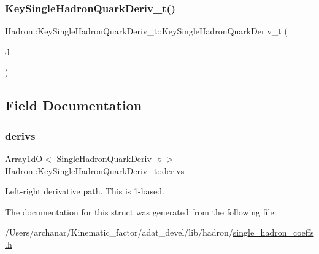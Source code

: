 \mbox{\label{structHadron_1_1KeySingleHadronQuarkDeriv__t_a35ce6c87867b7b8938820f4869b3f91c}} 
\subsubsection{\texorpdfstring{KeySingleHadronQuarkDeriv\_t()}{KeySingleHadronQuarkDeriv\_t()}\hspace{0.1cm}{\footnotesize\ttfamily [10/10]}}
{\footnotesize\ttfamily Hadron\+::\+Key\+Single\+Hadron\+Quark\+Deriv\+\_\+t\+::\+Key\+Single\+Hadron\+Quark\+Deriv\+\_\+t (\begin{DoxyParamCaption}\item[{const \mbox{\hyperlink{classADAT_1_1Array1dO}{Array1dO}}$<$ \mbox{\hyperlink{structHadron_1_1SingleHadronQuarkDeriv__t}{Single\+Hadron\+Quark\+Deriv\+\_\+t}} $>$ \&}]{d\+\_\+ }\end{DoxyParamCaption})\hspace{0.3cm}{\ttfamily [inline]}}



\subsection{Field Documentation}
\mbox{\label{structHadron_1_1KeySingleHadronQuarkDeriv__t_a338eadc820e14621fa645cc418c1e0fb}} 
\subsubsection{\texorpdfstring{derivs}{derivs}}
{\footnotesize\ttfamily \mbox{\hyperlink{classADAT_1_1Array1dO}{Array1dO}}$<$ \mbox{\hyperlink{structHadron_1_1SingleHadronQuarkDeriv__t}{Single\+Hadron\+Quark\+Deriv\+\_\+t}} $>$ Hadron\+::\+Key\+Single\+Hadron\+Quark\+Deriv\+\_\+t\+::derivs}

Left-\/right derivative path. This is 1-\/based. 

The documentation for this struct was generated from the following file\+:\begin{DoxyCompactItemize}
\item 
/\+Users/archanar/\+Kinematic\+\_\+factor/adat\+\_\+devel/lib/hadron/\mbox{\hyperlink{lib_2hadron_2single__hadron__coeffs_8h}{single\+\_\+hadron\+\_\+coeffs.\+h}}\end{DoxyCompactItemize}
